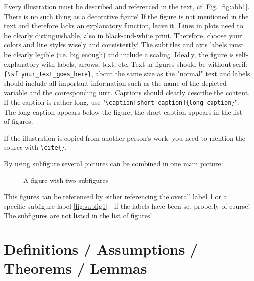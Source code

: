 Every illustration must be described and referenced in the text, cf. Fig. \ref{fig:abb1}.
There is no such thing as a decorative figure!
If the figure is not mentioned in the text and therefore lacks an explanatory function, leave it.
Lines in plots need to be clearly distinguishable, also in black-and-white print. Therefore, choose your colors and line styles wisely and consistently!
The subtitles and axis labels must be clearly legible (i.e. big enough) and include a scaling. Ideally, the figure is self-explanatory with labels, arrows, text, etc. Text in figures should be without serif: \verb|{\sf your_text_goes_here}|, about the same size as the "normal" text and labels should include all important information such as the name of the depicted variable and the corresponding unit. Captions should clearly describe the content. If the caption is rather long, use "\verb|\caption[short_caption]{long caption}|". The long caption appears below the figure, the short caption appears in the list of figures.

If the illustration is copied from another person's work, you need to mention the
source with \verb|\cite{}|.

By using subfigure several pictures can be combined in one main picture:

\begin{figure}[htb]
\centering
{}
\quad %

\caption[Abbrev. Descr. of subfigure-figure]{A figure with two subfigures}
\label{fig:OverallPic}
\end{figure}

This figures can be referenced by either referencing the overall label \ref{fig:OverallPic} or a specific subfigure label \ref{fig:subfig1} - if the labels have been set properly of course! The subfigures are not listed in the list of figures!

\section{Definitions / Assumptions / Theorems / Lemmas}

